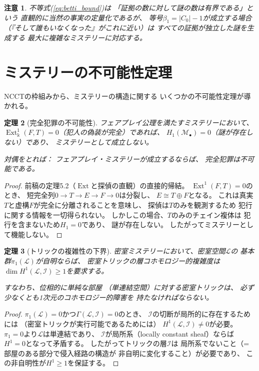 \documentclass[12pt,twocolumn]{ltjsarticle}
\newtheorem{theorem}{定理}[section]
\newtheorem{remark}[theorem]{注意}
\newcommand{\Ext}{\operatorname{Ext}}
\newcommand{\Mys}{\mathcal{M}}
\newcommand{\kk}{\Bbbk}
\newcommand{\Lock}{\mathcal{L}}
\begin{document}
\begin{remark}
不等式(\ref{eq:betti_bound})は
「証拠の数に対して謎の数は有界である」という
直観的に当然の事実の定量化であるが、
等号$\beta_1 = |C_0| - 1$が成立する場合
（『そして誰もいなくなった』がこれに近い）は
\emph{すべての証拠が独立した謎を生成する}
最大に複雑なミステリーに対応する。
\end{remark}


\section{ミステリーの不可能性定理}
\label{sec:impossibility}

NCCTの枠組みから、ミステリーの構造に関する
いくつかの不可能性定理が導かれる。

\begin{theorem}[完全犯罪の不可能性]
\label{thm:perfect_crime}
フェアプレイ公理を満たすミステリーにおいて、
$\Ext^1_\kk(F, T) = 0$（犯人の偽装が完全）であれば、
$H_1(\Mys_\bullet) = 0$（謎が存在しない）であり、
ミステリーとして成立しない。

対偶をとれば：
\emph{フェアプレイ・ミステリーが成立するならば、
完全犯罪は不可能である。}
\end{theorem}

\begin{proof}
前稿の定理5.2（$\Ext$と探偵の直観）の直接的帰結。
$\Ext^1(F, T) = 0$のとき、
短完全列$0 \to T \to E \to F \to 0$は分裂し、
$E \cong T \oplus F$となる。
これは真実$T$と虚構$F$が完全に分離されることを意味し、
探偵は$T$のみを観測するため
犯行に関する情報を一切得られない。
しかしこの場合、$T$のみのチェイン複体は
犯行を含まないため$H_1 = 0$であり、
謎が存在しない。
したがってミステリーとして機能しない。
\end{proof}

\begin{theorem}[トリックの複雑性の下界]
\label{thm:trick_complexity}
密室ミステリーにおいて、密室空間$\Lock$の
基本群$\pi_1(\Lock)$が自明ならば、
密室トリックの層コホモロジー的複雑度は
$\dim H^1(\Lock, \mathcal{I}) \geq 1$を要求する。

すなわち、\emph{位相的に単純な部屋}
（単連結空間）に対する密室トリックは、
必ず少なくとも1次元のコホモロジー的障害を
持たなければならない。
\end{theorem}

\begin{proof}
$\pi_1(\Lock) = 0$かつ$\Gamma(\Lock, \mathcal{I}) = 0$のとき、
$\mathcal{I}$の切断が局所的に存在するためには
（密室トリックが実行可能であるためには）
$H^1(\Lock, \mathcal{I}) \neq 0$が必要。
$\pi_1 = 0$より$\Lock$は単連結であり、
$\mathcal{I}$が局所系（locally constant sheaf）ならば
$H^1 = 0$となって矛盾する。
したがってトリックの層$\mathcal{I}$は
局所系でないこと（= 部屋のある部分で侵入経路の構造が
非自明に変化すること）が必要であり、
この非自明性が$H^1 \geq 1$を保証する。
\end{proof}
\end{document}
